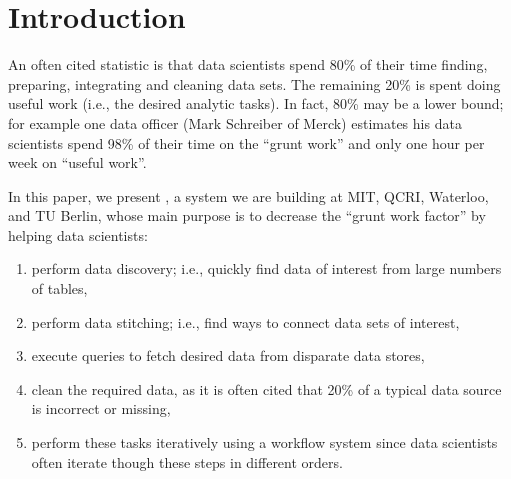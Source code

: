 \section{Introduction}
\label{introduction}

An often cited statistic is that data scientists spend 80\% of their time finding, preparing, integrating and cleaning data sets. The remaining 20\% is spent doing useful work (i.e., the desired analytic tasks). In fact, 80\% may be a lower bound; for example one data officer (Mark Schreiber of Merck) estimates his data scientists spend 98\% of their time on the ``grunt work'' and only one hour per week on ``useful work''. 

In this paper, we present \dcv, a system we are building at MIT, QCRI, Waterloo, and TU Berlin, whose main purpose is to decrease the ``grunt work factor'' by helping data scientists:



\begin{enumerate}[label=\roman*)]

\item perform data discovery; i.e., quickly find data of interest from large numbers of tables, 


\item perform data stitching; i.e., find ways to connect data sets of interest, 

\item execute queries to fetch desired data from disparate data stores, 


\item clean the required data, as it is often cited that 20\% of a typical data source is incorrect or missing,


\item perform these tasks iteratively using a workflow system since data scientists often iterate though these steps in different orders. 

\end{enumerate}

